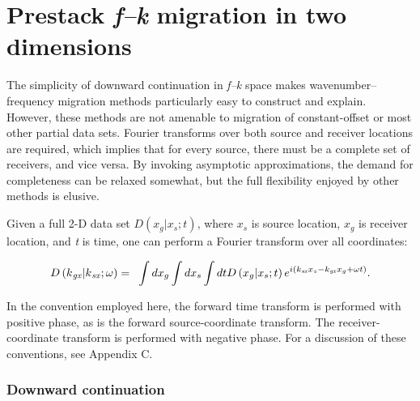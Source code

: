 \section{Prestack \textit{f--k} migration in two dimensions}

The simplicity of downward continuation in \textit{f--k} space makes wavenumber--frequency migration methods particularly easy to construct and explain.
However, these methods are not amenable to migration of constant-offset or most other partial data sets. Fourier transforms over both source
and receiver locations are required, which implies that for every source, there must be a complete set of receivers, and vice versa. By invoking
asymptotic approximations, the demand for completeness can be relaxed somewhat, but the full flexibility enjoyed by other methods is elusive.

Given a full 2-D data set \(D\left(x_g|x_s;t\right)\), where \(x_s\) is source location, \(x_g\) is receiver location, and \textit{t} is time, one
can perform a Fourier transform over all coordinates:
\begin{framed}
\begin{equation}\text{\textit{$D$}}\left(\text{\textit{$k$}}_{\text{\textit{gx}}}|\text{\textit{$k$}}_{\text{\textit{sx}}};\omega \right) =\text{
 }\int d\text{\textit{$x$}}_{\text{\textit{$g$}}}\int d\text{\textit{$x$}}_{\text{\textit{$s$}}}\int d\text{\textit{$t$}}\text{\textit{$ $}}\text{\textit{$D$}}\left(\text{\textit{$x$}}_{\text{\textit{$g$}}}|\text{\textit{$x$}}_{\text{\textit{$s$}}};\text{\textit{$t$}}\right)e^{i
\left(\text{\textit{$k$}}_{\text{\textit{sx}}}\text{\textit{$x$}}_{\text{\textit{$s$}}}-\text{\textit{$k$}}_{\text{\textit{gx}}}\text{\textit{$x$}}_{\text{\textit{$g$}}}+\omega
 \text{\textit{$t$}}\right)}.\end{equation}
\end{framed}

In the convention employed here, the forward time transform is performed with positive phase, as is the forward source-coordinate transform. The
receiver-coordinate transform is performed with negative phase. For a discussion of these conventions, see Appendix C.

\subsubsection{Downward continuation}

